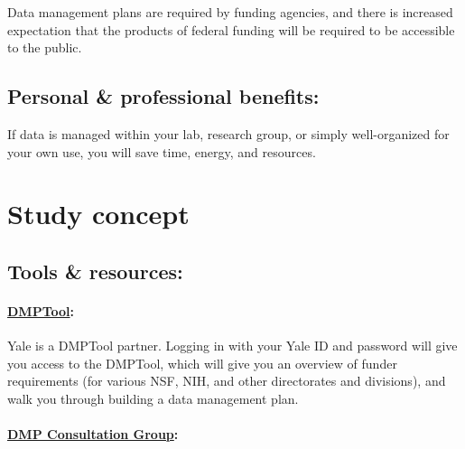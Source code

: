 \documentclass{tufte-handout}
\begin{document}
Data management plans are required by funding agencies, and there is increased expectation that the products of federal funding will be required to be accessible to the public.

\subsection{Personal \& professional benefits:}\label{personal-professional-benefits}

If data is managed within your lab, research group, or simply well-organized for your own use, you will save time, energy, and resources.


\section{Study concept}\label{study-concept}

\subsection{Tools \& resources:}\label{what-tools-and-resources-are-available}

\paragraph{\href{https://dmp.cdlib.org/}{DMPTool}:}\label{dmptool}

Yale is a DMPTool partner. Logging in with your Yale ID and password
will give you access to the DMPTool, which will give you an overview of
funder requirements (for various NSF, NIH, and other directorates and
divisions), and walk you through building a data management plan.

\paragraph{\href{http://csssi.yale.edu/dmp}{DMP Consultation
Group}:}\label{dmp-consultation-group}
\end{document}
